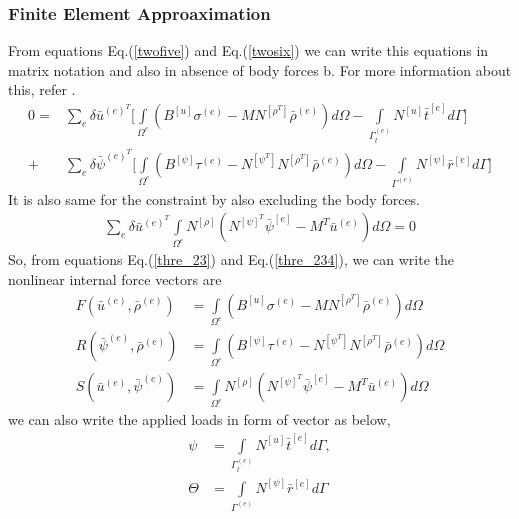 \documentclass[12pt]{article}
\begin{document}
\subsubsection{ Finite Element Approaximation  }
From equations Eq.(\ref{twofive}) and Eq.(\ref{twosix}) we can write this equations in matrix notation and also in absence of body forces b. For more information about this, refer \cite{Lzybell2007}.
\begin{equation}\label{thre_23}
\begin{aligned}
0 = &\sum_{e} \delta \bar{u}^{{(e)}^T} \Bigg[\int\limits_{\Omega^{e}}\! (B^{[u]}\sigma^{(e)} - MN^{[\rho^{T}]} \bar{\rho}^{(e)} ) d\Omega - \int\limits_{\Gamma^{(e)}_t}\!  N^{[u]}\bar{t}^{[e]}d\Gamma \Bigg] \\ + &\sum_{e} \delta \bar{\psi}^{{(e)}^T} \Bigg[\int\limits_{\Omega^{e}}\! (B^{[\psi]}\tau^{(e)} - N^{[\psi^{T}]}N^{[\rho^{T}]} \bar{\rho}^{(e)} ) d\Omega - \int\limits_{\Gamma^{(e)}}\!  N^{[\psi]}\bar{r}^{[e]}d\Gamma \Bigg]
\end{aligned}
\end{equation}
It is also same for the constraint by also excluding the body forces.
\begin{equation}\label{thre_234}
\begin{aligned}
\sum_{e} \delta \bar{u}^{{(e)}^T} \int\limits_{\Omega^{e}}\! N^{[\rho]}(N^{[\psi]^{T}}\bar{\psi}^{[e]} - M^T\bar{u}^{(e)} ) d\Omega = 0
\end{aligned}
\end{equation}
So, from equations Eq.(\ref{thre_23}) and Eq.(\ref{thre_234}), we can write the nonlinear internal force vectors are 
\begin{equation}\label{thre_2345}
\begin{aligned}
F(\bar{u}^{(e)},\bar{\rho}^{(e)}) &= \int\limits_{\Omega^{e}}\! (B^{[u]}\sigma^{(e)} - MN^{[\rho^{T}]} \bar{\rho}^{(e)} ) d\Omega \\
R(\bar{\psi}^{(e)},\bar{\rho}^{(e)}) &= \int\limits_{\Omega^{e}}\! (B^{[\psi]}\tau^{(e)} - N^{[\psi^{T}]}N^{[\rho^{T}]} \bar{\rho}^{(e)} ) d\Omega \\
S(\bar{u}^{(e)},\bar{\psi}^{(e)}) &= \int\limits_{\Omega^{e}}\! N^{[\rho]}(N^{[\psi]^{T}}\bar{\psi}^{[e]} - M^T\bar{u}^{(e)} ) d\Omega
\end{aligned}
\end{equation}
we can also write the applied loads in form of vector as below,
\begin{equation}\label{thre_23456}
\begin{aligned}
\psi &= \int\limits_{\Gamma^{(e)}_t}\!  N^{[u]}\bar{t}^{[e]}d\Gamma, \\
\Theta &= \int\limits_{\Gamma^{(e)}}\!  N^{[\psi]}\bar{r}^{[e]}d\Gamma
\end{aligned}
\end{equation}
\end{document}
